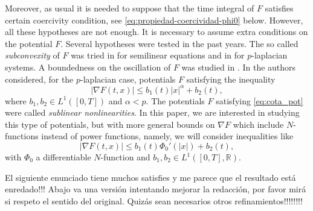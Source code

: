 \documentclass[twoside]{article}
\theoremstyle{remark}
\newcommand{\rr}{\mathbb{R}}
\renewcommand{\leq}{\leqslant}
\begin{document}
Moreover, as usual it is needed to suppose that the time integral of $F$ satisfies certain coercivity condition, see \eqref{eq:propiedad-coercividad-phi0} below.  However,  all these hypotheses are not enough. It is necessary to assume extra conditions on the potential $F$.
Several hypotheses were tested in the past years. The so called \emph{subconvexity} of $F$ was tried in \cite{wu1999periodic,tang1995periodic,zhao2004periodic} for semilinear equations and in \cite{xu2007some,tang2010periodic} for $p$-laplacian systems. A boundedness on the oscillation of $F$ was studied in \cite{ABGMS2015}. In \cite{tang1998periodic, tang2010periodic} the authors  considered, for the $p$-laplacian case, potentials $F$ satisfying the inequality
\begin{equation}\label{eq:cota_pot} |\nabla F(t,x)|\leq b_1(t)|x|^{\alpha}+b_2(t),
 \end{equation}
where  $b_1,b_2 \in L^1([0,T])$ and $\alpha<p$. The potentials $F$ satisfying \eqref{eq:cota_pot} 
were called  \emph{sublinear nonlinearities}. In this paper, we are interested in studying this type of potentials, 
but with more general bounds on $\nabla F$ which include $N$-functions instead of power functions, 
namely, we will consider inequalities like
\begin{equation}\label{holder_cont-mu}
  \left| \nabla F(t,x) \right|\leq b_1(t)\Phi_0'(|x|)+b_2(t),
  \tag{$A_6$}
\end{equation}
with $\Phi_0$  a differentiable $N$-function and $b_1,b_2 \in L^1([0,T],\rr)$.






{\color{red} El siguiente enunciado tiene muchos satisfies y me parece que el resultado est\'a enredado!!!
Abajo va una versi\'on intentando mejorar la redacci\'on, por favor mir\'a si respeto el sentido del original. 
Quiz\'as sean necesarios otros refinamientos!!!!!!!!}
\end{document}
